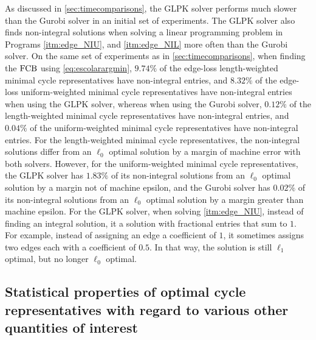 \DIFaddend As discussed in \se \ref{sec:timecomparisons}, the GLPK solver performs much slower than the Gurobi solver in an initial set of experiments. The GLPK solver also finds non-integral solutions when solving a linear programming problem in Programs
\ref{itm:edge_NIU}, and
\ref{itm:edge_NIL}
 more often than the Gurobi solver. On the same set of experiments as in \se \ref{sec:timecomparisons}, when finding the $\mathrm{FCB}$ using \pr \eqref{eq:escolarargmin}, $9.74\%$ of the edge-loss length-weighted minimal cycle representatives have non-integral entries, and $8.32\%$ of the edge-loss uniform-weighted minimal cycle representatives have non-integral entries when using the GLPK solver, whereas when using the Gurobi solver, $0.12\%$ of the length-weighted minimal cycle representatives have non-integral entries, and $0.04\%$ of the uniform-weighted minimal cycle representatives have non-integral entries. For the length-weighted minimal cycle representatives, the non-integral solutions differ from an $\ell_0$ optimal solution by a margin of machine error with both solvers. However, for the uniform-weighted minimal cycle representatives, the GLPK solver has $1.83\%$ of its non-integral solutions \DIFdelbegin {}\DIFdelend \DIFaddbegin {}\DIFaddend from an $\ell_0$ optimal solution by a margin not of machine epsilon, and the Gurobi solver has $0.02\%$ of its non-integral solutions \DIFdelbegin {}\DIFdelend \DIFaddbegin {}\DIFaddend from an $\ell_0$ optimal solution by a margin greater than machine epsilon. For the GLPK solver, when solving \pr
 \ref{itm:edge_NIU}, instead of finding an integral solution, it \DIFdelbegin {}\DIFdelend \DIFaddbegin {}\DIFaddend a solution with fractional entries that sum to $1$. For example, instead of assigning an edge a coefficient of $1$, it sometimes assigns two edges each with a coefficient of $0.5$. In that way, the solution is still $\ell_1$ optimal, but no longer $\ell_0$ optimal. \DIFdelbegin %
\DIFdelend \DIFaddbegin \emph{} 
\DIFaddend 

\subsection{Statistical properties of optimal cycle representatives with regard to various other quantities of interest}



